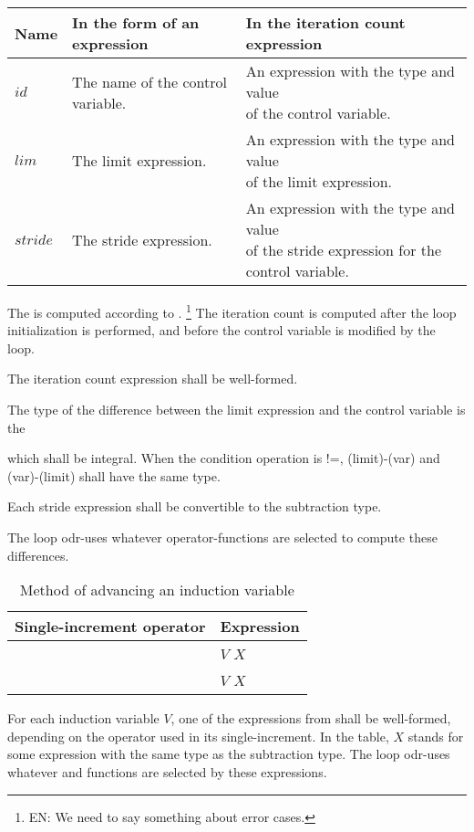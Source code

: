 \begin{table}[ht]
\begin{tabular}{|l|l|l|}
\hline
\bfseries Name&
\bfseries In the form of an expression&
\bfseries In the iteration count expression
\\ \hline
$id$&
The name of the control variable.&
\parbox[c][30pt]{2.5in}{
An expression with the type and value\\
of the control variable.
}
\\ \hline
$lim$&
The limit expression.&
\parbox[c][30pt]{2.5in}{
An expression with the type and value\\
of the limit expression.
}
\\ \hline
$stride$&
The stride expression.&
\parbox[c][40pt]{2.5in}{
An expression with the type and value\\
of the stride expression
for the control variable.
}
\\ \hline
\end{tabular}
\end{table}

\pnum
The
is computed according to
.%
\footnote{EN:
We need to say something about error cases.
}
The iteration count is computed after the loop initialization is performed,
and before the control variable is modified by the loop.
\begin{cpp}
The iteration count expression shall be well-formed.
\end{cpp}

\pnum
The type of the difference between the limit expression and the control variable
is the
%
\yescpp{,}
\begin{cpp}
which shall be integral.
When the condition operation is !=,
(limit)-(var) and (var)-(limit) shall have the same type.
\end{cpp}
Each stride expression shall be convertible to the subtraction type.
\begin{cpp}
The loop odr-uses whatever operator-functions are selected
to compute these differences.
\end{cpp}

\begin{cpp}

\begin{table}[ht]
\caption{
Method of advancing an induction variable
}
\label{tab:inc}
\centering
\begin{tabular}{|l|l|}
\hline
\bfseries Single-increment operator&
\bfseries Expression
\\ \hline
\tcode{++ += +}&
$V$ \tcode{+=} $X$
\\ \hline
\tcode{-- -= -}&
$V$ \tcode{-=} $X$
\\ \hline
\end{tabular}
\end{table}

\pnum
For each induction variable
$V$,
one of the expressions from
shall be well-formed,
depending on the operator used in its single-increment.
In the table,
$X$
stands for some expression with the same type as the subtraction type.
The loop odr-uses whatever
and
functions are selected by these expressions.
\end{cpp}

